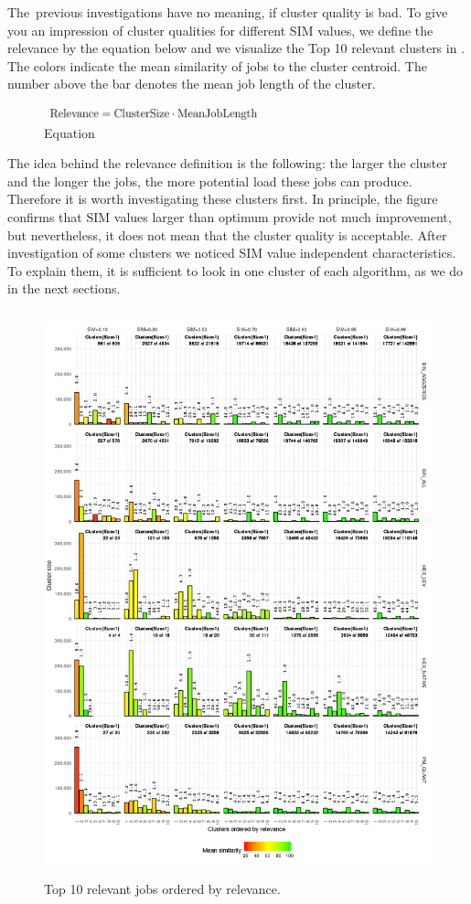 \documentclass[]{llncs}
\begin{document}
The\ previous investigations have no meaning, if cluster quality is bad.
To give you an  impression of cluster qualities for different SIM values, we define the relevance by the equation below and we visualize the Top 10 relevant clusters in
.
The colors indicate the mean similarity of jobs to the cluster centroid.
The number above the bar denotes the mean job length of the cluster.
\begin{figure}
  \centering
  \includegraphics[width=2.5in,height=0.12in]{./media/image16.png}
  \caption{Equation}
  \label{fig:equation}
\end{figure}
The idea behind the relevance definition is the following: the larger the cluster and the longer the jobs, the more potential load these jobs can produce.
Therefore it is worth investigating these clusters first.
In principle, the figure confirms that SIM values larger than optimum provide not much improvement, but nevertheless, it does not mean that the cluster quality is acceptable.
After investigation of some clusters we noticed SIM value independent characteristics.
To explain them, it is sufficient to look in one cluster of each algorithm, as we do in the next sections.
\begin{figure}
  \centering
   \includegraphics[width=4.61in,height=6.44in]{./media/image11.png}
   \caption{Top 10 relevant jobs ordered by relevance.}
   \label{fig:top10_relevant_jobs}
\end{figure}
\end{document}
